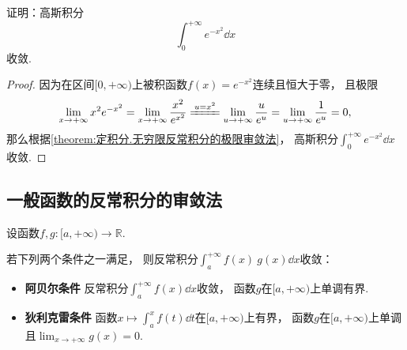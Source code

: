 \begin{example}\label{example:定积分.高斯积分的收敛性}
证明：高斯积分\[
	\int_0^{+\infty} e^{-x^2} \dd{x}
\]收敛.
\begin{proof}
因为在区间\([0,+\infty)\)上被积函数\(f(x) = e^{-x^2}\)连续且恒大于零，
且极限\[
	\lim_{x\to+\infty} x^2 e^{-x^2}
	= \lim_{x\to+\infty} \frac{x^2}{e^{x^2}}
	\xlongequal{u=x^2} \lim_{u\to+\infty} \frac{u}{e^u}
	= \lim_{u\to+\infty} \frac{1}{e^u}
	= 0,
\]
那么根据\cref{theorem:定积分.无穷限反常积分的极限审敛法}，
高斯积分\(\int_0^{+\infty} e^{-x^2} \dd{x}\)收敛.
\end{proof}
\end{example}

\subsection{一般函数的反常积分的审敛法}
\begin{theorem}\label{theorem:反常积分.无穷限的反常积分的阿贝尔--狄利克雷审敛法}
设函数\(f,g\colon[a,+\infty)\to\mathbb{R}\).

若下列两个条件之一满足，
则反常积分\(\int_a^{+\infty} f(x) ~ g(x) \dd{x}\)收敛：\begin{itemize}
	\item {\bf 阿贝尔条件}
	反常积分\(\int_a^{+\infty} f(x) \dd{x}\)收敛，
	函数\(g\)在\([a,+\infty)\)上单调有界.

	\item {\bf 狄利克雷条件}
	函数\(x \mapsto \int_a^x f(t) \dd{t}\)在\([a,+\infty)\)上有界，
	函数\(g\)在\([a,+\infty)\)上单调且\(\lim_{x\to+\infty} g(x) = 0\).
\end{itemize}
\end{theorem}

